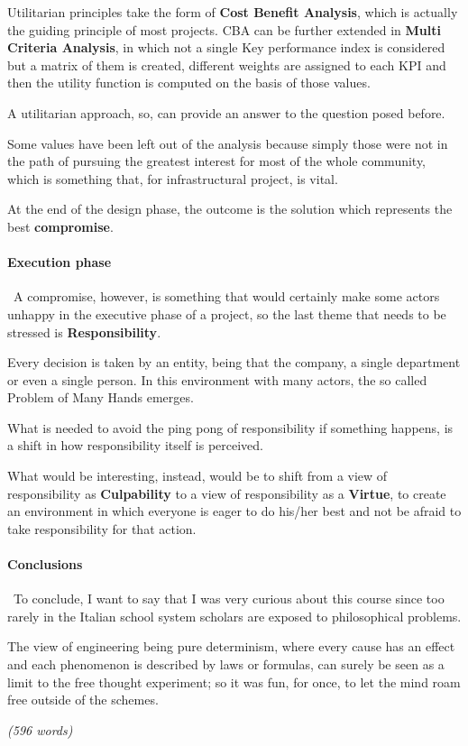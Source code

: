Utilitarian principles take the form of \textbf{Cost Benefit Analysis}, which is actually the guiding principle of most projects. CBA can  be further extended in \textbf{Multi Criteria Analysis}, in which not a single Key performance index is considered but a matrix of them is created, different weights are assigned to each KPI and then the utility function is computed on the basis of those values. 

A utilitarian approach, so, can provide an answer to the question posed before. 

Some values have been left out of the analysis because simply those were not in the path of pursuing the greatest interest for most of the whole community, which is something that, for infrastructural project, is vital. 

At the end of the design phase, the outcome is the solution which represents the best \textbf{compromise}.

\newpage
\paragraph{Execution phase}\
A compromise, however, is something that would certainly make some actors unhappy in the executive phase of a project, so the last theme that needs to be stressed is \textbf{Responsibility}.  

Every decision is taken by an entity, being that the company, a single department or even a single person. In this environment with many actors, the so called Problem of Many Hands \cite{VANDEPOEL2018MoralHands.} emerges. 

What is needed to avoid the ping pong of responsibility if something happens, is a shift in how responsibility itself is perceived.  

What would be interesting, instead, would be to shift from a view of responsibility as \textbf{Culpability} \cite{EuropeanCommission2020EthicsEU} to a view of responsibility as a \textbf{Virtue}, to create an environment in which everyone is eager to do his/her best and not be afraid to take responsibility for that action.

\paragraph{Conclusions}\
To conclude, I want to say that I was very curious about this course since too rarely in the Italian school system scholars are exposed to philosophical problems.

The  view of engineering being pure determinism, where every cause has an effect and each phenomenon is described by laws or formulas, can surely be seen as a limit to the free thought experiment; so it  was fun, for once, to let the mind roam free outside of the schemes.

\emph{(596 words)}